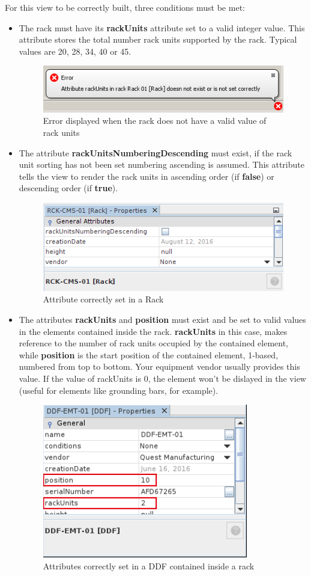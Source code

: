 \documentclass[a4paper]{article}
\begin{document}
		For this view to be correctly built, three conditions must be met:
		\begin{itemize}
			\item The rack must have its \textbf{rackUnits} attribute set to a valid integer value. This attribute stores the total number rack units supported by the rack. Typical values are 20, 28, 34, 40 or 45.
			\begin{figure}[h!]
				\centering
				\includegraphics[width=0.6\linewidth]{img/error_rack_view_not_rackunits.png}
				\caption{Error displayed when the rack does not have a valid value of rack units}
				\label{fig:error_rack_view_not_rackunits}
			\end{figure}
			\item The attribute \textbf{rackUnitsNumberingDescending} must exist, if the rack unit sorting has not been set numbering ascending is assumed. This attribute tells the view to render the rack units in ascending order (if \textbf{false}) or descending order (if \textbf{true}).
			\begin{figure}
				\centering
				\includegraphics[width=0.4\linewidth]{img/rack_units_numbering_descending_attribute.png}
				\caption{Attribute correctly set in a Rack}
				\label{fig:rack_units_numbering_descending_attribute}
			\end{figure}
			\item The attributes \textbf{rackUnits} and \textbf{position} must exist and be set to valid values in the elements contained inside the rack. \textbf{rackUnits} in this case, makes reference to the number of rack units occupied by the contained element, while \textbf{position} is the start position of the contained element, 1-based, numbered from top to bottom. Your equipment vendor usually provides this value. If the value of rackUnits is 0, the element won't be dislayed in the view (useful for elements like grounding bars, for example).
			\begin{figure}[h!]
				\centering
				\includegraphics[width=0.4\linewidth]{img/rack_view_attributes_contained_element.png}
				\caption{Attributes correctly set in a DDF contained inside a rack}
				\label{fig:rack_view_attributes_contained_element}
			\end{figure}
		\end{itemize}
\end{document}
